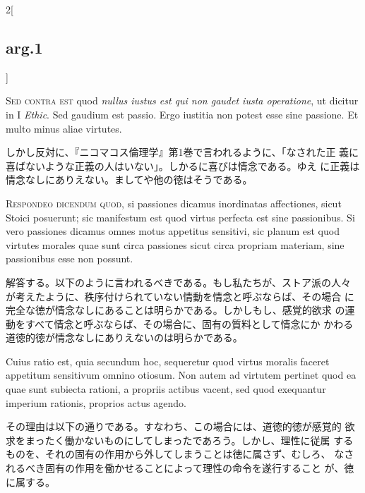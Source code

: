 \documentclass[paper=a4paper,fontsize=10pt,jafontsize=9pt,titlepage]{jlreq}
\begin{document}
\begin{paracol}{2}[\subsection{arg.1}]
\switchcolumn*[\subsection{s.c.}]

{\scshape Sed contra est} quod {\itshape nullus iustus est qui non
 gaudet iusta operatione}, ut dicitur in I {\itshape Ethic}. Sed
 gaudium est passio. Ergo iustitia non potest esse sine passione. Et
 multo minus aliae virtutes.

\switchcolumn

しかし反対に、『ニコマコス倫理学』第1巻で言われるように、「なされた正
 義に喜ばないような正義の人はいない」。しかるに喜びは情念である。ゆえ
 に正義は情念なしにありえない。ましてや他の徳はそうである。


{\scshape Respondeo dicendum quod}, si passiones dicamus inordinatas
 affectiones, sicut Stoici posuerunt; sic manifestum est quod virtus
 perfecta est sine passionibus. Si vero passiones dicamus omnes motus
 appetitus sensitivi, sic planum est quod virtutes morales quae sunt
 circa passiones sicut circa propriam materiam, sine passionibus esse
 non possunt.

\switchcolumn

解答する。以下のように言われるべきである。もし私たちが、ストア派の人々
 が考えたように、秩序付けられていない情動を情念と呼ぶならば、その場合
 に完全な徳が情念なしにあることは明らかである。しかしもし、感覚的欲求
 の運動をすべて情念と呼ぶならば、その場合に、固有の質料として情念にか
 かわる道徳的徳が情念なしにありえないのは明らかである。

\switchcolumn*

Cuius ratio est, quia secundum hoc, sequeretur quod virtus moralis
 faceret appetitum sensitivum omnino otiosum. Non autem ad virtutem
 pertinet quod ea quae sunt subiecta rationi, a propriis actibus
 vacent, sed quod exequantur imperium rationis, proprios actus agendo.

\switchcolumn

その理由は以下の通りである。すなわち、この場合には、道徳的徳が感覚的
 欲求をまったく働かないものにしてしまったであろう。しかし、理性に従属
 するものを、それの固有の作用から外してしまうことは徳に属さず、むしろ、
 なされるべき固有の作用を働かせることによって理性の命令を遂行すること
 が、徳に属する。


\end{paracol}
\end{document}
